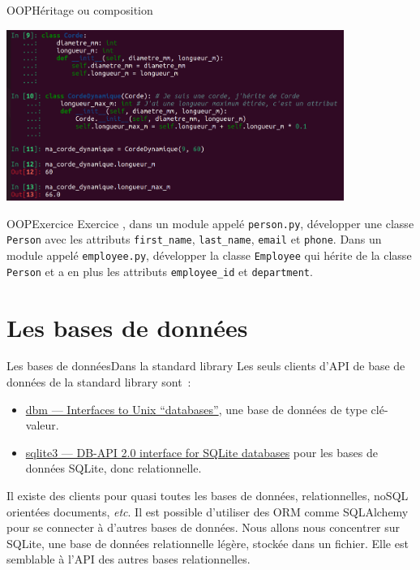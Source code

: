 \documentclass{beamer}
\begin{document}
    \begin{frame}{OOP}{Héritage ou composition}

        \centering
        \includegraphics[width=11cm]{image/inheritance-or-composition}
    \end{frame}

    \begin{frame}{OOP}{Exercice}
        Exercice \execcounterdispinc{}, dans un module appelé \lstinline{person.py}, développer une classe \lstinline{Person} avec les attributs \lstinline{first_name}, \lstinline{last_name}, \lstinline{email} et \lstinline{phone}.
        \bigbreak
        Dans un module appelé \lstinline{employee.py}, développer la classe \lstinline{Employee} qui hérite de la classe \lstinline{Person} et a en plus les attributs \lstinline{employee_id} et \lstinline{department}.
    \end{frame}


    \section{Les bases de données}\label{sec:database}

    \begin{frame}{Les bases de données}{Dans la standard library}
        Les seuls clients d'API de base de données de la standard library sont~:
        \begin{itemize}
            \item \href{https://docs.python.org/3/library/dbm.html}{dbm — Interfaces to Unix “databases”}, une base de données de type clé-valeur.
            \item \href{https://docs.python.org/3/library/sqlite3.html}{sqlite3 — DB-API 2.0 interface for SQLite databases} pour les bases de données SQLite, donc relationnelle.
        \end{itemize}
        \bigbreak
        Il existe des clients pour quasi toutes les bases de données, relationnelles, noSQL orientées documents, \textit{etc}.
        Il est possible d'utiliser des ORM comme SQLAlchemy pour se connecter à d'autres bases de données.
        \bigbreak
        Nous allons nous concentrer sur SQLite, une base de données relationnelle légère, stockée dans un fichier.
        Elle est semblable à l'API des autres bases relationnelles.
    \end{frame}
\end{document}

